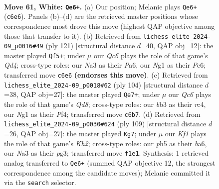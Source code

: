 \documentclass[11pt]{article}
\begin{document}
\clearpage

\begin{figure}[p]\centering
\begin{subfigure}{0.46\textwidth}\centering
\resizebox{\linewidth}{!}{%
\newchessgame
\chessboard[
  setfen={8/4P3/p1Q5/3P1k1p/6p1/Nb6/5P1q/5KN1 w - - 1 61},
  showmover=false,
  pgfstyle=straightmove, color=movearrow, markmove={c6-e6}
]}
\caption{}
\end{subfigure}\hfill
\begin{subfigure}{0.46\textwidth}\centering
\resizebox{\linewidth}{!}{%
\newchessgame
\chessboard[
  setfen={6k1/4Q2p/p3p1p1/3q2P1/P4K1P/8/8/8 b - - 3 61},
  showmover=false,
  pgfstyle=straightmove, color=movearrow, markmove={d5-f5}
]}
\caption{}
\end{subfigure}
\\[4pt]
\begin{subfigure}{0.46\textwidth}\centering
\resizebox{\linewidth}{!}{%
\newchessgame
\chessboard[
  setfen={3Q4/pk6/4p1N1/5q2/2r2P2/7P/6PK/8 w - - 4 53},
  showmover=false,
  pgfstyle=straightmove, color=movearrow, markmove={d8-e7}
]}
\caption{}
\end{subfigure}\hfill
\begin{subfigure}{0.46\textwidth}\centering
\resizebox{\linewidth}{!}{%
\newchessgame
\chessboard[
  setfen={8/7k/B2Q3p/4n1p1/8/p5P1/5PK1/q7 b - - 1 55},
  showmover=false,
  pgfstyle=straightmove, color=movearrow, markmove={h7-g7}
]}
\caption{}
\end{subfigure}
\caption{\textbf{Move 61, White: \texttt{Qe6+}.} (a) Our position; Melanie plays \texttt{Qe6+} (\texttt{c6e6}). Panels (b)--(d) are the retrieved master positions whose correspondence most drove this move (highest QAP objective among those that transfer to it). (b) Retrieved from \texttt{lichess\_elite\_2024-09\_p0016\#49} (ply 121) [structural distance $d$=40, QAP obj=12]: the master played \texttt{Qf5+}; under $\mu$ our \emph{Qc6} plays the role of that game's \emph{Qd4}; cross-type roles: our \emph{N}a3 as their \emph{P}a6, our \emph{N}g1 as their \emph{P}e6; transferred move \texttt{c6e6} \textbf{(endorses this move)}. (c) Retrieved from \texttt{lichess\_elite\_2024-09\_p0018\#62} (ply 104) [structural distance $d$=38, QAP obj=27]: the master played \texttt{Qe7+}; under $\mu$ our \emph{Qc6} plays the role of that game's \emph{Qd8}; cross-type roles: our \emph{b}b3 as their \emph{r}c4, our \emph{N}g1 as their \emph{P}f4; transferred move \texttt{c6b7}. (d) Retrieved from \texttt{lichess\_elite\_2024-09\_p0030\#624} (ply 109) [structural distance $d$=26, QAP obj=27]: the master played \texttt{Kg7}; under $\mu$ our \emph{Kf1} plays the role of that game's \emph{Kh2}; cross-type roles: our \emph{p}h5 as their \emph{b}a6, our \emph{N}a3 as their \emph{p}g3; transferred move \texttt{f1e1}. Synthesis: 1 retrieved analog transferred to \texttt{Qe6+} (summed QAP objective 12, the strongest correspondence among the candidate moves); Melanie committed it via the \texttt{search} selector.}
\label{fig:thought-m120}
\end{figure}
\end{document}
